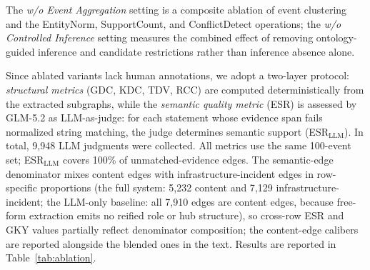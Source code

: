 \documentclass[a4paper,fleqn]{cas-dc}
\begin{document}
The \textit{w/o Event Aggregation} setting is a composite ablation of
event clustering and the EntityNorm, SupportCount, and ConflictDetect
operations; the \textit{w/o Controlled Inference} setting measures the
combined effect of removing ontology-guided inference and candidate
restrictions rather than inference absence alone.

Since ablated variants lack human annotations, we adopt a two-layer
protocol: \emph{structural metrics} (GDC, KDC, TDV, RCC) are computed
deterministically from the extracted subgraphs, while the
\emph{semantic quality metric} (ESR) is assessed by GLM-5.2 as
LLM-as-judge:
for each statement whose evidence span fails normalized string
matching, the judge determines semantic support
(ESR$_{\text{LLM}}$).
In total, 9{,}948 LLM judgments were collected.
All metrics use the same 100-event set; ESR$_{\text{LLM}}$ covers
100\% of unmatched-evidence edges.
The semantic-edge denominator mixes content edges with
infrastructure-incident edges in row-specific proportions (the full
system: 5{,}232 content and 7{,}129 infrastructure-incident; the
LLM-only baseline: all 7{,}910 edges are content edges, because
free-form extraction emits no reified role or hub structure), so
cross-row ESR and GKY values partially reflect denominator
composition; the content-edge calibers are reported alongside the
blended ones in the text.
Results are reported in Table~\ref{tab:ablation}.
\end{document}
